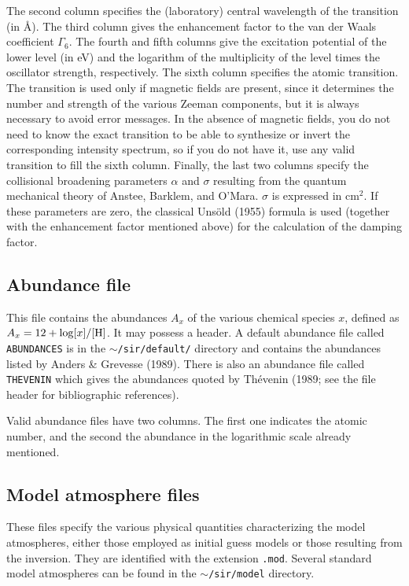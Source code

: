 The second column specifies the (laboratory) central wavelength of the 
transition (in \AA\/). The third column gives the enhancement factor 
to the van der Waals coefficient $\Gamma_6$.  The fourth and fifth columns give
the excitation potential of the lower level (in eV) and the logarithm
of the multiplicity of the level times the oscillator strength,
respectively.  The sixth column specifies the atomic
transition. The transition is used only if magnetic fields are present,
since it determines the number and strength of the various Zeeman
components, but it is always necessary to avoid error messages. In the
absence of magnetic fields, you do not need to know the exact
transition to be able to synthesize or invert the corresponding
intensity spectrum, so if you do not have it, use any valid transition
to fill the sixth column. Finally, the last two columns specify the 
collisional broadening parameters $\alpha$ and $\sigma$ resulting
from the quantum mechanical theory of Anstee, Barklem, and O'Mara. 
$\sigma$ is expressed in cm$^2$. If these parameters are zero, 
the classical Uns\"old (1955) formula is used (together with the
enhancement factor mentioned above) for the calculation of the 
damping factor. 

\subsection{Abundance file}
This file contains the abundances $A_x$ of the various chemical 
species $x$, defined as $A_x = 12 + \log [x]/[{\rm H}]$. It may 
possess a header. A default abundance file called {\tt ABUNDANCES} 
is in the {\tt $\sim$/sir/default/} directory and contains the 
abundances listed by Anders \& Grevesse (1989). There is also an 
abundance file called {\tt THEVENIN} which gives the abundances 
quoted by Th\'evenin (1989; see the file header for 
bibliographic references).

Valid abundance files have two columns. The first one indicates 
the atomic number, and the second the abundance in the logarithmic 
scale already mentioned.

\subsection{Model atmosphere files}
\label{modelo}
These files specify the various physical quantities characterizing 
the model atmospheres, either those employed as initial guess models 
or those resulting from the inversion. They are identified with the
extension {\tt .mod}. Several standard  model atmospheres can be 
found in the {\tt $\sim$/sir/model} directory.

